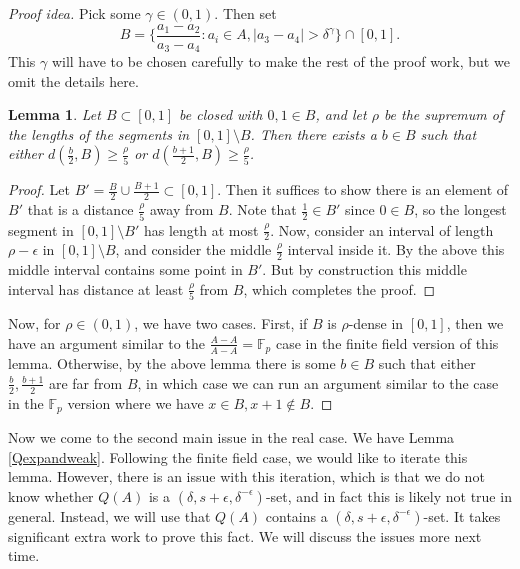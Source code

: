 \documentclass[12pt]{amsart}
\newtheorem{lemma}[theorem]{Lemma}
\newcommand{\F}{\mathbb{F}}
\newcommand{\eps}{\epsilon}
\begin{document}
\begin{proof}[Proof idea]
    Pick some $\gamma\in(0,1)$. Then set 
    $$B=\{\frac{a_1-a_2}{a_3-a_4}:a_i\in A,|a_3-a_4|>\delta^\gamma\}\cap[0,1].$$
    This $\gamma$ will have to be chosen carefully to make the rest of the proof work, but we omit the details here.

    \begin{lemma}
        Let $B\subset[0,1]$ be closed with $0,1\in B$, and let $\rho$ be the supremum of the lengths of the segments in $[0,1]\setminus B$. Then there exists a $b\in B$ such that either $d(\frac{b}{2},B)\geq\frac{\rho}{5}$ or $d(\frac{b+1}{2},B)\geq\frac{\rho}{5}$.
    \end{lemma}
    \begin{proof}
        Let $B'=\frac{B}{2}\cup\frac{B+1}{2}\subset[0,1]$. Then it suffices to show there is an element of $B'$ that is a distance $\frac{\rho}{5}$ away from $B$. Note that $\frac{1}{2}\in B'$ since $0\in B$, so the longest segment in $[0,1]\setminus B'$ has length at most $\frac{\rho}{2}$. Now, consider an interval of length $\rho-\eps$ in $[0,1]\setminus B$, and consider the middle $\frac{\rho}{2}$ interval inside it. By the above this middle interval contains some point in $B'$. But by construction this middle interval has distance at least $\frac{\rho}{5}$ from $B$, which completes the proof.
    \end{proof}

    Now, for $\rho\in(0,1)$, we have two cases. First, if $B$ is $\rho$-dense in $[0,1]$, then we have an argument similar to the $\frac{A-A}{A-A}=\F_p$ case in the finite field version of this lemma. Otherwise, by the above lemma there is some $b\in B$ such that either $\frac{b}{2},\frac{b+1}{2}$ are far from $B$, in which case we can run an argument similar to the case in the $\F_p$ version where we have $x\in B,x+1\not\in B$.
\end{proof}

Now we come to the second main issue in the real case.   We have Lemma \ref{Qexpandweak}.   Following the finite field case,  we would like to iterate this lemma.    However, there is an issue with this iteration, which is that we do not know whether $Q(A)$ is a $(\delta,s+\eps,\delta^{-\eps})$-set, and in fact this is likely not true in general.   Instead, we will use that $Q(A)$ contains a $(\delta,s+\eps,\delta^{-\eps})$-set.   It takes significant extra work to prove this fact.   We will discuss the issues more next time.
\end{document}
